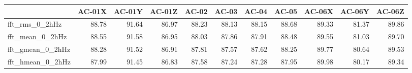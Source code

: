 \begin{tabular}{lrrrrrrrrrr}
\toprule
{} &  AC-01X &  AC-01Y &  AC-01Z &  AC-02 &  AC-03 &  AC-04 &  AC-05 &  AC-06X &  AC-06Y &  AC-06Z \\
\midrule
fft\_rms\_0\_2hHz   &   88.78 &   91.64 &   86.97 &  88.23 &  88.13 &  88.15 &  88.68 &   89.33 &   81.37 &   89.86 \\
fft\_mean\_0\_2hHz  &   88.55 &   91.58 &   86.95 &  88.03 &  87.86 &  87.91 &  88.48 &   89.55 &   81.03 &   89.70 \\
fft\_gmean\_0\_2hHz &   88.28 &   91.52 &   86.91 &  87.81 &  87.57 &  87.62 &  88.25 &   89.77 &   80.64 &   89.53 \\
fft\_hmean\_0\_2hHz &   87.99 &   91.45 &   86.83 &  87.58 &  87.24 &  87.28 &  87.95 &   89.98 &   80.17 &   89.34 \\
\bottomrule
\end{tabular}
